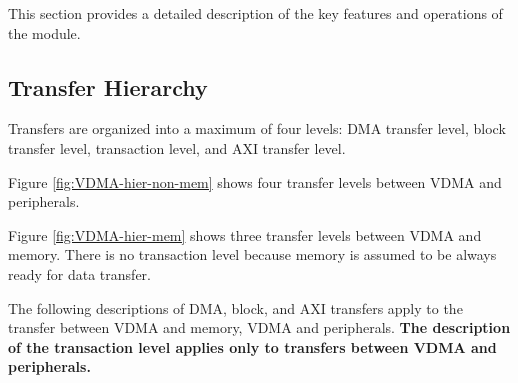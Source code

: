 \documentclass[main\_\_EN.tex]{subfiles}
\begin{document}
This section provides a detailed description of the key features and operations of the module.

\subsection{Transfer Hierarchy}
\label{sec:vdma-transfer-hierarchy}

Transfers are organized into a maximum of four levels: DMA transfer level, block transfer level, transaction level, and AXI transfer level.

Figure \ref{fig:VDMA-hier-non-mem} shows four transfer levels between VDMA and peripherals.

Figure \ref{fig:VDMA-hier-mem} shows three transfer levels between VDMA and memory. There is no transaction level because memory is assumed to be always ready for data transfer.

The following descriptions of DMA, block, and AXI transfers apply to the transfer between VDMA and memory, VDMA and peripherals. \textbf{The description of the transaction level applies only to transfers between VDMA and peripherals.}
\end{document}

